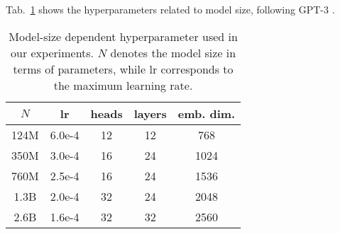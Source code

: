 Tab.~\ref{tab:model_sizes} shows the hyperparameters related to model size, following GPT-3 \cite{brown2020languagemodelsfewshotlearners}.
\begin{table}[ht]
\centering
\scriptsize
\begin{tabular}{c|cccc}
\toprule
$N$ & lr & heads & layers & emb. dim. \\ 
\midrule
124M & 6.0e-4 & 12 & 12 & 768 \\
350M & 3.0e-4 & 16 & 24 & 1024 \\
760M & 2.5e-4 & 16 & 24 & 1536 \\
1.3B & 2.0e-4 & 32 & 24 & 2048 \\
2.6B & 1.6e-4 & 32 & 32 & 2560 \\
\bottomrule 
\end{tabular}
\caption{Model-size dependent hyperparameter used in our experiments. $N$ denotes the model size in terms of parameters, while lr corresponds to the maximum learning rate.}
\label{tab:model_sizes}
\end{table}
